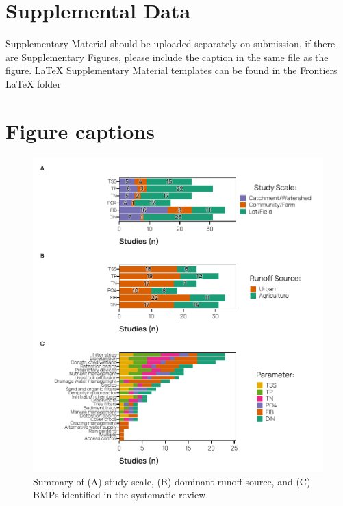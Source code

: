 \documentclass[utf8]{FrontiersinHarvard}
\begin{document}
\hypertarget{supplemental-data}{%
\section*{Supplemental Data}\label{supplemental-data}}

Supplementary Material should be uploaded separately on submission, if there are
Supplementary Figures, please include the caption in the same file as the
figure. LaTeX Supplementary Material templates can be found in the Frontiers
LaTeX folder




\hypertarget{figure-captions}{%
\section*{Figure captions}\label{figure-captions}}

\begin{figure}
\includegraphics[width=1\linewidth,]{../figures/bmp_summary} \caption{Summary of (A) study scale, (B) dominant runoff source, and (C) BMPs identified in the systematic review.}\label{fig:bmpsummary}
\end{figure}
\end{document}
